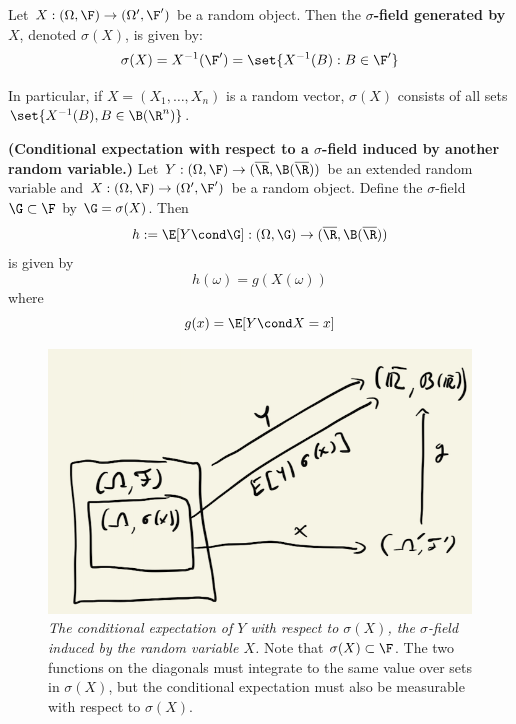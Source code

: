 \documentclass{article} %
\begin{document}
\begin{definition}
Let $X: (\Omega, \F) \to (\Omega', \F')$ be a random object.  Then the \textbf{$\sigma$-field generated by $X$}, denoted $\sigma(X)$, is given by:
\[ \sigma(X) = X^{-1}(\F') = \set{X^{-1}(B) : B \in \F'} \]
\label{def:sigma_field_generated_by_a_random_object}
\end{definition}

\begin{remark}
In particular, if $X = (X_1,\hdots,X_n)$ is a random vector, $\sigma(X)$ consists of all sets $\set{X^{-1}(B), B \in \B(\R^n)}$. %
\end{remark}


\begin{proposition}\textbf{(Conditional expectation with respect to a $\sigma$-field induced by another random variable.)}
Let $Y: (\Omega, \F) \to (\overline{\R}, \B(\overline{\R}))$ be an extended random variable and  $X: (\Omega, \F) \to (\Omega', \F')$ be a random object.  Define the $\sigma$-field $\G \subset \F$ by $\G =\sigma(X)$.  
Then 
\[ h:= \E[Y \cond \G] : (\Omega, \G) \to (\overline{\R}, \B(\overline{\R}))\]
is given by 
\[ h(\omega) = g(X(\omega))\]
where 
\[g(x) = \E[Y \cond X=x]\]
\label{prop:conditional_expectation_wrt_sigma_field_induced_by_another_random_variable}
\end{proposition}

\begin{figure}[H]
\centering
\includegraphics[width=.6\linewidth]{images/conditional_expectation_wrt_sigma_field_induced_by_RV}
\caption{\textit{The conditional expectation of $Y$ with respect to $\sigma(X)$, the $\sigma$-field induced by the random variable $X$.} Note that $\sigma(X) \subset \F$. The two functions on the diagonals must integrate to the same value over sets in $\sigma(X)$, but the conditional expectation must also be measurable with respect to $\sigma(X)$.}
\label{fig:conditional_expectation_with_respect_to_a_sigma_field_induced_by_another_random_variable}	
\end{figure}
\end{document}
